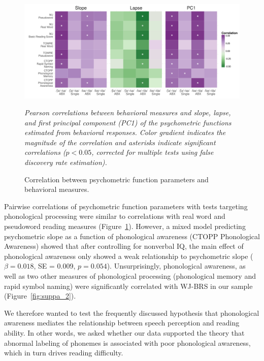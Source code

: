 \documentclass[../uwthesis.tex]{subfiles}
\begin{document}
\begin{figure}
    \centering
    \caption{Correlation between psychometric function parameters and behavioral measures.}
    \label{fig:f}
    \includegraphics[width = 18 cm]{images/paper_1/pairwise_corr.png}
    \item \textit{Pearson correlations between behavioral measures and slope, lapse, and first principal component (PC1) of the psychometric functions estimated from behavioral responses. Color gradient indicates the magnitude of the correlation and asterisks indicate significant correlations ($p<0.05$, corrected for multiple tests using false discovery rate estimation).}
\end{figure}

Pairwise correlations of psychometric function parameters with tests targeting phonological processing were similar to correlations with real word and pseudoword reading measures (Figure~\ref{fig:f}). However, a mixed model predicting psychometric slope as a function of phonological awareness (CTOPP Phonological Awareness) showed that after controlling for nonverbal IQ, the main effect of phonological awareness only showed a weak relationship to psychometric slope ($\beta= 0.018$, SE = 0.009, $p = 0.054$). Unsurprisingly, phonological awareness, as well as two other measures of phonological processing (phonological memory and rapid symbol naming) were significantly correlated with WJ-BRS in our sample (Figure~\ref{fig:suppa_2}).
 
We therefore wanted to test the frequently discussed hypothesis that phonological awareness mediates the relationship between speech perception and reading ability. In other words, we asked whether our data supported the theory that abnormal labeling of phonemes is associated with poor phonological awareness, which in turn drives reading difficulty. 
\end{document}
